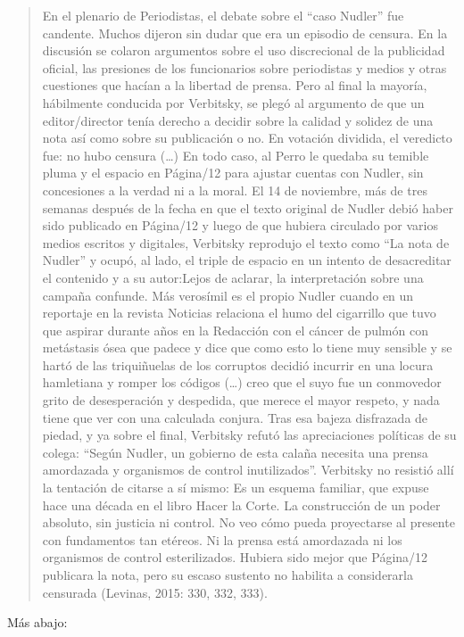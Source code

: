 \begin{quote}
En el plenario de Periodistas, el debate sobre el ``caso Nudler'' fue candente. Muchos dijeron sin dudar que era un episodio de censura. En la discusión se colaron argumentos sobre el uso discrecional de la publicidad oficial, las presiones de los funcionarios sobre periodistas y medios y otras cuestiones que hacían a la libertad de prensa. Pero al final la mayoría, hábilmente conducida por Verbitsky, se plegó al argumento de que un editor/director tenía derecho a decidir sobre la calidad y solidez de una nota así como sobre su publicación o no. En votación dividida, el veredicto fue: no hubo censura (\ldots) En todo caso, al Perro le quedaba su temible pluma y el espacio en Página/12 para ajustar cuentas con Nudler, sin concesiones a la verdad ni a la moral. El 14 de noviembre, más de tres semanas después de la fecha en que el texto original de Nudler debió haber sido publicado en Página/12 y luego de que hubiera circulado por varios medios escritos y digitales, Verbitsky reprodujo el texto como ``La nota de Nudler'' y ocupó, al lado, el triple de espacio en un intento de desacreditar el contenido y a su autor:Lejos de aclarar, la interpretación sobre una campaña confunde. Más verosímil es el propio Nudler cuando en un reportaje en la revista Noticias relaciona el humo del cigarrillo que tuvo que aspirar durante años en la Redacción con el cáncer de pulmón con metástasis ósea que padece y dice que como esto lo tiene muy sensible y se hartó de las triquiñuelas de los corruptos decidió incurrir en una locura hamletiana y romper los códigos (\ldots) creo que el suyo fue un conmovedor grito de desesperación y despedida, que merece el mayor respeto, y nada tiene que ver con una calculada conjura. Tras esa bajeza disfrazada de piedad, y ya sobre el final, Verbitsky refutó las apreciaciones políticas de su colega: ``Según Nudler, un gobierno de esta calaña necesita una prensa amordazada y organismos de control inutilizados''. Verbitsky no resistió allí la tentación de citarse a sí mismo: Es un esquema familiar, que expuse hace una década en el libro Hacer la Corte. La construcción de un poder absoluto, sin justicia ni control. No veo cómo pueda proyectarse al presente con fundamentos tan etéreos. Ni la prensa está amordazada ni los organismos de control esterilizados. Hubiera sido mejor que Página/12 publicara la nota, pero su escaso sustento no habilita a considerarla censurada (Levinas, 2015: 330, 332, 333).
\end{quote}

Más abajo:

